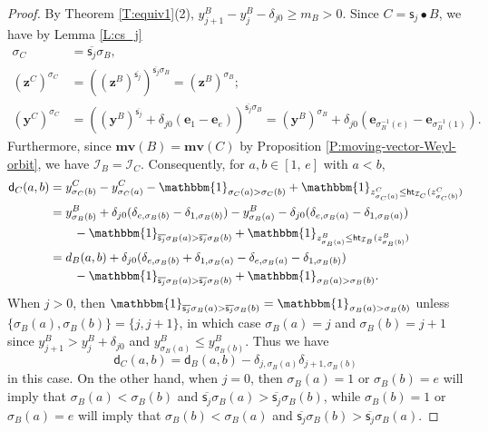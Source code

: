 \documentclass[11pt,a4paper,reqno]{amsart}
\numberwithin{equation}{section}
\theoremstyle{plain}
\theoremstyle{definition}
\theoremstyle{remark}
\numberwithin{equation}{section}
\newcommand{\bbone}{\mathbbm{1}}
\newcommand{\by}{\mathbf{y}}
\newcommand{\bz}{\mathbf{z}}
\newcommand{\mv}{\mathbf{mv}}
\newcommand{\cs}{\mathsf{s}}
\newcommand{\Be}{\mathbf{e}}
\newcommand{\DDot}[1]{\mathrel{\overset{#1}{\bullet}}}
\newcommand{\Ht}{\mathsf{ht}}
\newcommand{\II}{\mathcal{I}}
\newcommand{\dd}{\mathsf{d}}
\begin{document}
\begin{proof}
By Theorem \ref{T:equiv1}(2),
$y^B_{j+1} - y^B_j - \delta_{j0} \geq m_B > 0$.
Since $C = \cs_j \DDot{} B$, we have by Lemma \ref{L:cs_j}
\begin{align*}
\sigma_C 
&= \overline{\cs_j} \sigma_{B}, \\
(\bz^C)^{\sigma_C} &= ((\bz^B)^{\overline{\cs_j}})^{\overline{\cs_j}\sigma_B} = (\bz^B)^{\sigma_B}; \\
(\by^C)^{\sigma_C} &= ((\by^B)^{\overline{\cs_j}} + \delta_{j0}(\Be_1 - \Be_e))^{\overline{\cs_j}\sigma_B}
= (\by^B)^{\sigma_B} + \delta_{j0}(\Be_{\sigma_B^{-1}(e)} - \Be_{\sigma_B^{-1}(1)}).
\end{align*}
Furthermore, since $\mv(B) = \mv(C)$ by Proposition \ref{P:moving-vector-Weyl-orbit}, we have $\II_B = \II_C$.
Consequently,
for $a,b \in [1,\, e]$ with $a< b$,
\begin{align*}
\dd_{C}(a,b)
&= y^{C}_{\sigma_C(b)} - y^{C}_{\sigma_{C}(a)} - \bbone_{\sigma_{C}(a) > \sigma_{C}(b)} + \bbone_{z^{C}_{\sigma_{C}(a)} \leq \Ht_{\II_C} (z^{C}_{\sigma_{C}(b)})} \\
&= y^B_{\sigma_B(b)} + \delta_{j0}(\delta_{e,\sigma_B(b)} - \delta_{1,\sigma_B(b)}) - y^B_{\sigma_B(a)} - \delta_{j0}(\delta_{e,\sigma_B(a)} - \delta_{1,\sigma_B(a)}) \\
&\qquad - \bbone_{\overline{\cs_j}\sigma_B(a) > \overline{\cs_j}\sigma_B(b)} + \bbone_{z^{B}_{\sigma_{B}(a)} \leq \Ht_{\II_B} (z^{B}_{\sigma_B(b)})} \\
&= d_B(a,b) + \delta_{j0}(\delta_{e,\sigma_B(b)} + \delta_{1,\sigma_B(a)} - \delta_{e,\sigma_B(a)} - \delta_{1,\sigma_B(b)} ) \\
&\qquad - \bbone_{\overline{\cs_j}\sigma_B(a) > \overline{\cs_j}\sigma_B(b)} + \bbone_{\sigma_B(a) > \sigma_B(b)}.
\end{align*}
When $j > 0$, then $\bbone_{\overline{\cs_j}\sigma_B(a) > \overline{\cs_j}\sigma_B(b)} = \bbone_{\sigma_B(a) > \sigma_B(b)}$ unless $\{\sigma_B(a),\sigma_B(b)\} = \{j,j+1\}$, in which case $\sigma_B(a) = j$ and $\sigma_B(b) = j+1$ since $y^B_{j+1} > y^B_j + \delta_{j0}$ and $y^B_{\sigma_B(a)} \leq y^B_{\sigma_B(b)}$.
Thus we have
$$
\dd_C(a,b) = \dd_B(a,b)- \delta_{j,\sigma_B(a)}\delta_{j+1,\sigma_B(b)}
$$
in this case.
On the other hand, when $j = 0$, then $\sigma_B(a) = 1$ or $\sigma_B(b) = e$ will imply that $\sigma_B(a) < \sigma_B(b)$ and $\overline{\cs_j}\sigma_B(a) > \overline{\cs_j}\sigma_B(b)$, while $\sigma_B(b) = 1$ or $\sigma_B(a) = e$ will imply that $\sigma_B(b) < \sigma_B(a)$ and $\overline{\cs_j}\sigma_B(b) > \overline{\cs_j}\sigma_B(a)$.

\end{proof}
\end{document}
